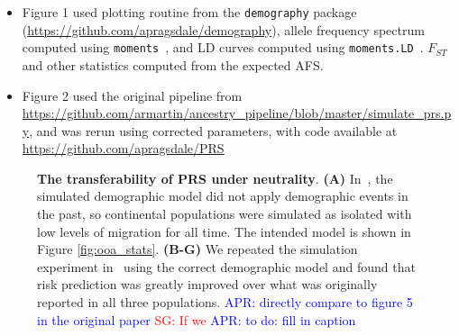 \documentclass{article}
\newcommand{\aprcomment}[1]{{\textcolor{blue}{APR: #1}}}
\newcommand{\sgcomment}[1]{{\textcolor{red}{SG: #1}}}
\begin{document}
\begin{itemize}
\item Figure 1 used plotting routine from the \texttt{demography} package (\url{https://github.com/apragsdale/demography}),
allele frequency spectrum computed using \texttt{moments}~\citep{jouganous2017inferring}, and LD curves
computed using \texttt{moments.LD}~\citep{ragsdale2019models}. $F_{ST}$ and other statistics computed
from the expected AFS.
\item Figure 2 used the original pipeline from \url{https://github.com/armartin/ancestry_pipeline/blob/master/simulate_prs.py},
and was rerun using corrected parameters, with code available at \url{https://github.com/apragsdale/PRS}
\end{itemize}




\pagebreak



\begin{figure}[ht]
\begin{center}
\caption{\textbf{The transferability of PRS under neutrality}.
    \textbf{(A)} In~\citet{martin2017human}, the simulated demographic model did not apply demographic
    events in the past, so continental populations were simulated as isolated with low levels of migration
    for all time. The intended model is shown in Figure \ref{fig:ooa_stats}.
    \textbf{(B-G)} We repeated the simulation experiment in~\cite{martin2017human} using the correct
    demographic model and found that risk prediction was greatly improved over what was originally
    reported in all three populations.
    \aprcomment{directly compare to figure 5 in the original paper} \sgcomment{If we }
    \aprcomment{to do: fill in caption}
}
\label{fig:prs}
\end{center}
\end{figure}
\end{document}

